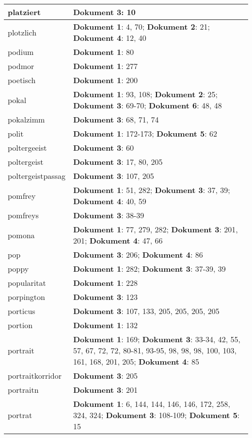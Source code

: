 \documentclass[a5paper]{article}
\begin{document}
\begin{longtable}[l]{|l|p{3in}|}
\hline
platziert & \textbf{Dokument 3}: 10 \\
\hline
plotzlich & \textbf{Dokument 1}: 4, 70; \textbf{Dokument 2}: 21; \textbf{Dokument 4}: 12, 40 \\
\hline
podium & \textbf{Dokument 1}: 80 \\
\hline
podmor & \textbf{Dokument 1}: 277 \\
\hline
poetisch & \textbf{Dokument 1}: 200 \\
\hline
pokal & \textbf{Dokument 1}: 93, 108; \textbf{Dokument 2}: 25; \textbf{Dokument 3}: 69-70; \textbf{Dokument 6}: 48, 48 \\
\hline
pokalzimm & \textbf{Dokument 3}: 68, 71, 74 \\
\hline
polit & \textbf{Dokument 1}: 172-173; \textbf{Dokument 5}: 62 \\
\hline
poltergeeist & \textbf{Dokument 3}: 60 \\
\hline
poltergeist & \textbf{Dokument 3}: 17, 80, 205 \\
\hline
poltergeistpassag & \textbf{Dokument 3}: 107, 205 \\
\hline
pomfrey & \textbf{Dokument 1}: 51, 282; \textbf{Dokument 3}: 37, 39; \textbf{Dokument 4}: 40, 59 \\
\hline
pomfreys & \textbf{Dokument 3}: 38-39 \\
\hline
pomona & \textbf{Dokument 1}: 77, 279, 282; \textbf{Dokument 3}: 201, 201; \textbf{Dokument 4}: 47, 66 \\
\hline
pop & \textbf{Dokument 3}: 206; \textbf{Dokument 4}: 86 \\
\hline
poppy & \textbf{Dokument 1}: 282; \textbf{Dokument 3}: 37-39, 39 \\
\hline
popularitat & \textbf{Dokument 1}: 228 \\
\hline
porpington & \textbf{Dokument 3}: 123 \\
\hline
porticus & \textbf{Dokument 3}: 107, 133, 205, 205, 205, 205 \\
\hline
portion & \textbf{Dokument 1}: 132 \\
\hline
portrait & \textbf{Dokument 1}: 169; \textbf{Dokument 3}: 33-34, 42, 55, 57, 67, 72, 72, 80-81, 93-95, 98, 98, 98, 100, 103, 161, 168, 201, 205; \textbf{Dokument 4}: 85 \\
\hline
portraitkorridor & \textbf{Dokument 3}: 205 \\
\hline
portraitn & \textbf{Dokument 3}: 201 \\
\hline
portrat & \textbf{Dokument 1}: 6, 144, 144, 146, 146, 172, 258, 324, 324; \textbf{Dokument 3}: 108-109; \textbf{Dokument 5}: 15 \\

\end{longtable}
\end{document}
